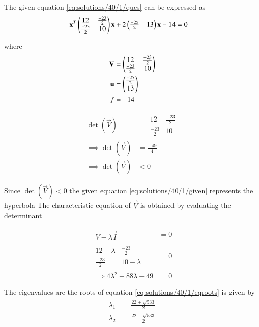 The given equation \eqref{eq:solutions/40/1/ques} can be expressed as 
\begin{align}
&\mathbf{x}^T\begin{pmatrix}12 & \frac{-23}{2}\\\frac{-23}{2} & 10\end{pmatrix}\mathbf{x}+2\begin{pmatrix}\frac{-25}{2} & 13\end{pmatrix}\mathbf{x}-14=0\label{eq:solutions/40/1/given}
\end{align}

where 
\begin{align}
\mathbf{V}&=\begin{pmatrix}12 & \frac{-23}{2}\\\frac{-23}{2} & 10\end{pmatrix}\\
\mathbf{u}&=\begin{pmatrix}\frac{-25}{2} \\ 13\end{pmatrix}\\
f&=-14
\end{align}

\begin{align}
    \det(\vec{V})&=\begin{array}{|cc|}
12 & \frac{-23}{2}\\\frac{-23}{2} & 10
\end{array}\\
\implies\det(\vec{V})&=\frac{-49}{4}\\
\implies\det(\vec{V})&<0
\end{align}

Since $\det(\vec{V})<0$ the given equation \eqref{eq:solutions/40/1/given} represents the hyperbola
The characteristic equation of $\vec{V}$ is obtained by evaluating the determinant 

\begin{align}
       \begin{array}{|c|}
V-\lambda\vec{I}
\end{array}&=0\\
   \begin{array}{|cc|}
12-\lambda & \frac{-23}{2} \\ \frac{-23}{2} & 10-\lambda
\end{array}&=0\\
\implies 4\lambda^2-88\lambda-49&=0\label{eq:solutions/40/1/eqroots}
\end{align}

The eigenvalues are the roots of equation \ref{eq:solutions/40/1/eqroots} is given by 
\begin{align}
    \lambda_1&=\frac{22+\sqrt{533}}{2}\label{eq:solutions/40/1/eqeig1}\\
    \lambda_2&=\frac{22-\sqrt{533}}{2}\label{eq:solutions/40/1/eqeig2}
\end{align}

